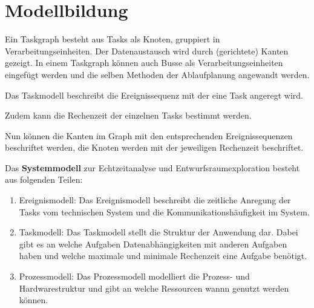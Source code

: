 \section{Modellbildung}
Ein Taskgraph besteht aus Tasks als Knoten, gruppiert in Verarbeitungseinheiten.
Der Datenaustausch wird durch (gerichtete) Kanten gezeigt.
In einem Taskgraph können auch Busse als Verarbeitungseinheiten eingefügt werden
und die selben Methoden der Ablaufplanung angewandt werden.

Das Taskmodell beschreibt die Ereignissequenz mit der eine Task angeregt wird.

Zudem kann die Rechenzeit der einzelnen Tasks bestimmt werden.

Nun können die Kanten im Graph mit den entsprechenden Ereignissequenzen beschriftet
werden, die Knoten werden mit der jeweiligen Rechenzeit beschriftet.

\begin{tcolorbox}
    Das \textbf{Systemmodell} zur Echtzeitanalyse und Entwurfsraumexploration
    besteht aus folgenden Teilen:
    \begin{enumerate}
        \item Ereignismodell: Das Ereignismodell beschreibt die zeitliche Anregung der
            Tasks vom technischen System und die Kommunikationshäufigkeit im System.
        \item Taskmodell: Das Taskmodell stellt die Struktur der Anwendung dar. Dabei
            gibt es an welche Aufgaben Datenabhängigkeiten mit anderen Aufgaben haben
            und welche maximale und minimale Rechenzeit eine Aufgabe benötigt.
        \item Prozessmodell: Das Prozessmodell modelliert die Prozess- und
            Hardwarestruktur und gibt an welche Ressourcen wannn genutzt werden können.
    \end{enumerate}
\end{tcolorbox}
